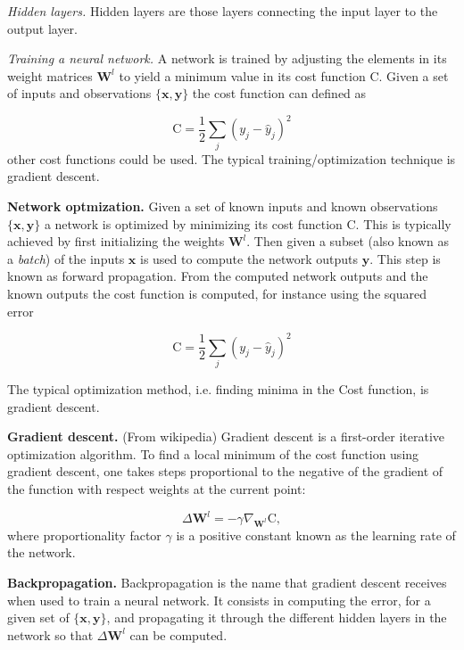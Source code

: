 \documentclass[11pt,onecolumn]{article}
\begin{document}
\textit{Hidden layers.} Hidden layers are those layers connecting the input layer to the output layer.

\textit{Training a neural network.}  A network is trained by adjusting the elements in 
its weight matrices $\mathbf{W}^{l}$ to yield a minimum value in its cost function $\mathrm{C}$. Given 
a set of inputs and observations $\{\mathbf{x},\mathbf{y}\}$ the cost function can defined as 

\begin{equation}
    \mathrm{C} = \frac{1}{2}\sum_j(y_j - \hat{y}_j)^2
\end{equation}
other cost functions could be used. The typical training/optimization technique is gradient descent.  

\textbf{Network optmization.} Given a set of known inputs and known observations 
$\{\mathbf{x},\mathbf{y}\}$ a network is optimized by minimizing its cost function $\mathrm{C}$. 
This is typically achieved by first initializing the weights $\mathbf{W}^{l}$. 
Then given a subset (also known as a \textit{batch}) of the inputs 
$\mathbf{x}$ is used to compute the network outputs $\mathbf{\hat{y}}$. 
This step is known as forward propagation. From the computed network outputs and the known outputs 
the cost function is computed, for instance using the squared error 

\begin{equation}
    \mathrm{C} = \frac{1}{2}\sum_j(y_j - \hat{y}_j)^2
\end{equation}

The typical optimization method, i.e. finding minima in the Cost function, is gradient descent. 

\textbf{Gradient descent.} (From wikipedia) Gradient descent is a first-order iterative optimization 
algorithm. To find a local minimum of the cost function using gradient descent, 
one takes steps proportional to the negative of the gradient of the function with respect weights at 
the current point:

\begin{equation}
	\Delta \mathbf{W}^{l} = - \gamma \nabla_{\mathbf{W}^{l}} \mathrm{C},
\end{equation}
where proportionality factor $\gamma$ is a positive constant known as the learning rate of the network. 

\textbf{Backpropagation.} Backpropagation is the name that gradient descent receives when used to 
train a neural network. It consists in computing the error, for a given set of 
$\{\mathbf{x},\mathbf{y}\}$, and propagating it through the different hidden layers in the network so that 
$\Delta \mathbf{W}^{l}$ can be computed.
\end{document}
